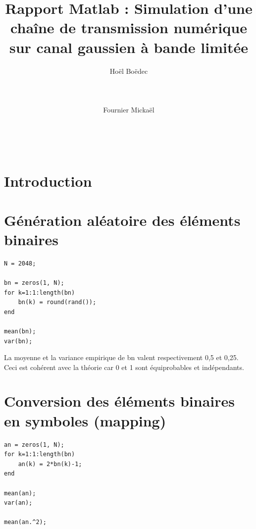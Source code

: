 \documentclass{acm_proc_article-sp}
\begin{document}
\title{Rapport Matlab : Simulation d'une chaîne de transmission numérique sur canal gaussien à bande limitée}

\author{
\alignauthor
Hoël Boëdec\\
       \\
       \\
       \\
\alignauthor
Fournier Mickaël\\
       \\
       \\
       \\
}

\maketitle

\section{Introduction}

\section{Génération aléatoire des éléments binaires}
\begin{lstlisting}
N = 2048;

bn = zeros(1, N);
for k=1:1:length(bn)
    bn(k) = round(rand());
end

mean(bn);
var(bn);
\end{lstlisting}
La moyenne et la variance empirique de bn valent respectivement 0,5 et 0,25. Ceci est cohérent avec la théorie car 0 et 1 sont équiprobables et indépendants.


\section{Conversion des éléments binaires en symboles (mapping)}
\begin{lstlisting}
an = zeros(1, N);
for k=1:1:length(bn)
    an(k) = 2*bn(k)-1;
end

mean(an);
var(an);

mean(an.^2);
\end{lstlisting}
\end{document}
